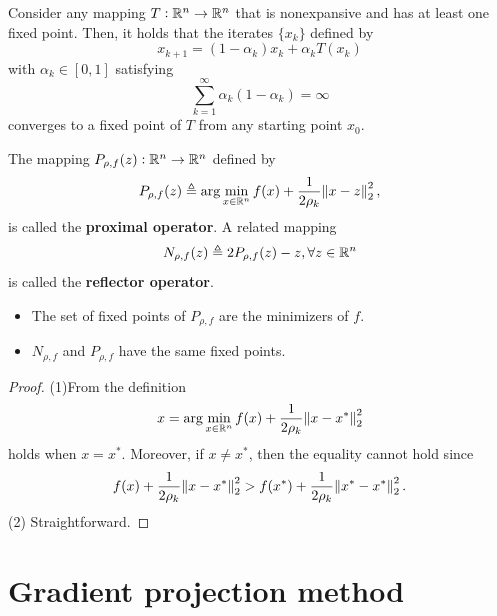 \begin{refsection}
\begin{theorem}
Consider any mapping $T:\mathbb{R}^n\to \mathbb{R}^n$ that is nonexpansive and has at least one fixed point. Then, it holds that the iterates $\{x_k\}$ defined by
$$x_{k+1} = (1-\alpha_k)x_k + \alpha_k T(x_k)$$
with $\alpha_k \in [0,1]$ satisfying
$$\sum_{k=1}^\infty \alpha_k(1-\alpha_k) = \infty$$
converges to a fixed point of $T$ from any starting point $x_0$.
\end{theorem}



\begin{lemma}

\end{lemma}









\begin{definition}
The mapping $P_{\rho,f}(z): \mathbb{R}^n \to \mathbb{R}^n$ defined by
$$P_{\rho,f}(z) \triangleq \arg\min_{x\in \mathbb{R}^n} f(x) + \frac{1}{2\rho_k}\norm{x - z}_2^2,$$
is called the \textbf{proximal operator}.
A related mapping 
$$N_{\rho,f}(z) \triangleq 2P_{\rho,f}(z) - z,\forall z\in \mathbb{R}^n$$
is called the \textbf{reflector operator}.
\end{definition}


\begin{lemma}\hfill
\begin{itemize}
	\item The set of fixed points of $P_{\rho,f}$ are the minimizers of $f$.
	\item $N_{\rho,f}$ and $P_{\rho,f}$ have the same fixed points.
\end{itemize}
\end{lemma}
\begin{proof}
(1)From the definition 
$$x = \arg\min_{x\in \mathbb{R}^n} f(x) + \frac{1}{2\rho_k}\norm{x - x^*}_2^2$$	
holds when $x = x^*$. Moreover, if $x\neq x^*$, then the equality cannot hold since $$f(x) + \frac{1}{2\rho_k}\norm{x - x^*}_2^2 > f(x^*) + \frac{1}{2\rho_k}\norm{x^* - x^*}_2^2.$$
(2) Straightforward.
\end{proof}

\cite[246]{bertsekas2015convex}


\section{Gradient projection method}

\end{refsection}
